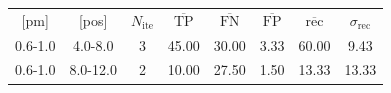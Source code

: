 \begin{table}
\begin{tabular}{cccccccc}
[pm] & [pos] & $N_{\mathrm{ite}}$ & $\overline{\mathrm{TP}}$ & $\overline{\mathrm{FN}}$ & $\overline{\mathrm{FP}}$ & $\overline{\mathrm{rec}}$ & $\sigma_{\mathrm{rec}}$ \\
0.6-1.0 & 4.0-8.0 & 3 & 45.00 & 30.00 & 3.33 & 60.00 & 9.43 \\
0.6-1.0 & 8.0-12.0 & 2 & 10.00 & 27.50 & 1.50 & 13.33 & 13.33 \\
\end{tabular}
\end{table}
